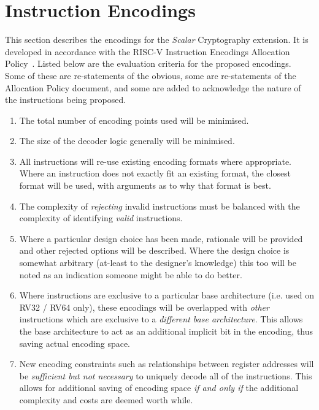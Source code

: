 
\newpage
\section{Instruction Encodings}
\label{sec:scalar:encodings}

This section describes the encodings for the {\em Scalar} Cryptography
extension.
It is developed in accordance with the RISC-V Instruction Encodings
Allocation Policy~\cite{riscv:policy:encodings}.
Listed below are the evaluation criteria for the proposed encodings.
Some of these are re-statements of the obvious, some are re-statements of
the Allocation Policy document, and some are added to acknowledge the
nature of the instructions being proposed.

\begin{enumerate}
\item \label{itm:enc:1}
The total number of encoding points used will be minimised.
\item \label{itm:enc:2}
The size of the decoder logic generally will be minimised.
\item \label{itm:enc:3}
All instructions will re-use existing encoding formats where
appropriate. Where an instruction does not exactly fit an existing format,
the closest format will be used, with arguments as to why that format is
best.
\item \label{itm:enc:4}
The complexity of {\em rejecting} invalid instructions must be balanced with
the complexity of identifying {\em valid} instructions.
\item \label{itm:enc:5}
Where a particular design choice has been made, rationale will be provided
and other rejected options will be described.
Where the design choice is somewhat arbitrary (at-least to the designer's
knowledge) this too will be noted as an indication someone might be
able to do better.
\item \label{itm:enc:6}
Where instructions are exclusive to a particular base architecture
(i.e. used on RV32 / RV64 only), these encodings will be overlapped with
{\em other} instructions which are exclusive to a {\em different base
architecture}. This allows the base architecture to act as an additional
implicit bit in the encoding, thus saving actual encoding space.
\item \label{itm:enc:7}
New encoding constraints such as relationships between register addresses
will be {\em sufficient but not necessary} to uniquely decode all of
the instructions.
This allows for additional saving of encoding space {\em if and only if}
the additional complexity and costs are deemed worth while.
\end{enumerate}

